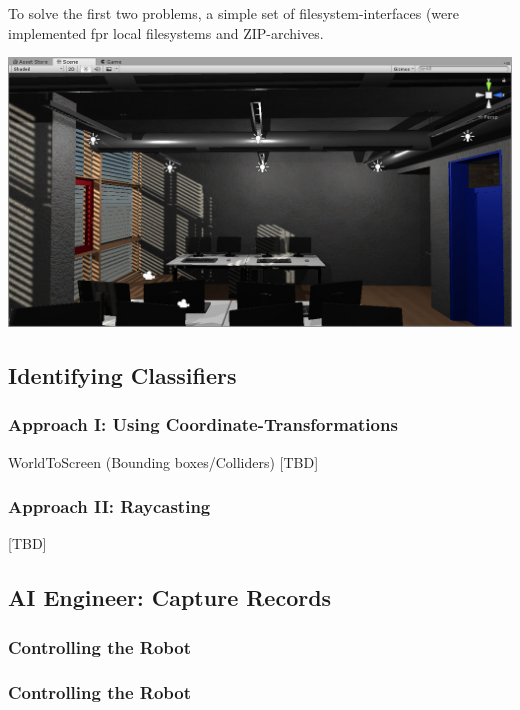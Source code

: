 To solve the first two problems, a simple set of filesystem-interfaces (were implemented fpr local filesystems and ZIP-archives.

\begin{center}
\noindent\includegraphics[width=14cm]{tex/img/ch05/UnitySceneA205_02.png}
\label{fig:unity-scene-a205}
\end{center}

\subsection{Identifying Classifiers}
\subsubsection{Approach I: Using Coordinate-Transformations}
WorldToScreen (Bounding boxes/Colliders) [TBD]

\subsubsection{Approach II: Raycasting}
[TBD]

\subsection{AI Engineer: Capture Records}
\subsubsection{Controlling the Robot}

\subsubsection{Controlling the Robot}


